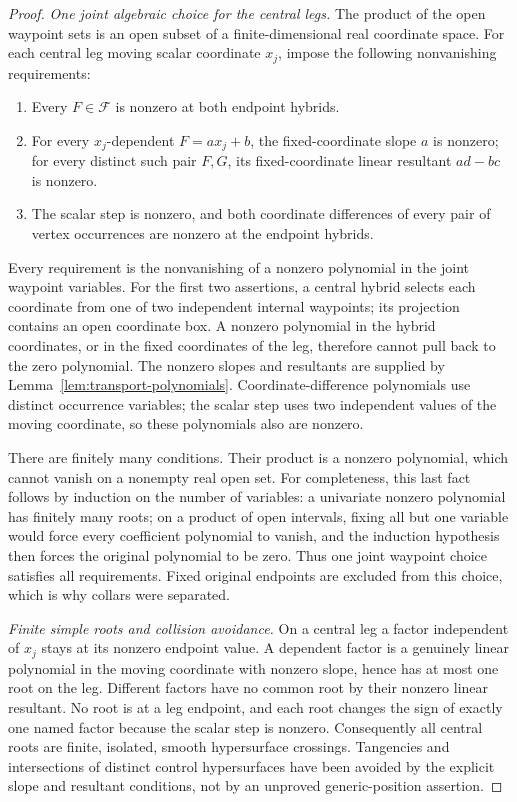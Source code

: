 \begin{proof}
\emph{One joint algebraic choice for the central legs.}
The product of the open waypoint sets is an open subset of a finite-dimensional
real coordinate space. For each central leg moving scalar coordinate $x_j$,
impose the following nonvanishing requirements:
\begin{enumerate}
\item Every $F\in\mathcal F$ is nonzero at both endpoint hybrids.
\item For every $x_j$-dependent $F=a x_j+b$, the fixed-coordinate slope $a$
is nonzero; for every distinct such pair $F,G$, its fixed-coordinate
linear resultant $ad-bc$ is nonzero.
\item The scalar step is nonzero, and both coordinate differences of every
pair of vertex occurrences are nonzero at the endpoint hybrids.
\end{enumerate}
Every requirement is the nonvanishing of a nonzero polynomial in the joint
waypoint variables. For the first two assertions, a central hybrid selects
each coordinate from one of two independent internal waypoints; its projection
contains an open coordinate box. A nonzero polynomial in the hybrid coordinates,
or in the fixed coordinates of the leg, therefore cannot pull back to the zero
polynomial. The nonzero slopes and resultants are supplied by
Lemma~\ref{lem:transport-polynomials}. Coordinate-difference polynomials use
distinct occurrence variables; the scalar step uses two independent values
of the moving coordinate, so these polynomials also are nonzero.

There are finitely many conditions. Their product is a nonzero polynomial,
which cannot vanish on a nonempty real open set. For completeness, this last
fact follows by induction on the number of variables: a univariate nonzero
polynomial has finitely many roots; on a product of open intervals, fixing all
but one variable would force every coefficient polynomial to vanish, and the
induction hypothesis then forces the original polynomial to be zero.
Thus one joint waypoint choice satisfies all requirements. Fixed original
endpoints are excluded from this choice, which is why collars were separated.

\emph{Finite simple roots and collision avoidance.}
On a central leg a factor independent of $x_j$ stays at its nonzero endpoint
value. A dependent factor is a genuinely linear polynomial in the moving
coordinate with nonzero slope, hence has at most one root on the leg.
Different factors have no common root by their nonzero linear resultant.
No root is at a leg endpoint, and each root changes the sign of exactly one
named factor because the scalar step is nonzero. Consequently all central
roots are finite, isolated, smooth hypersurface crossings. Tangencies and
intersections of distinct control hypersurfaces have been avoided by the
explicit slope and resultant conditions, not by an unproved generic-position
assertion.


\end{proof}
